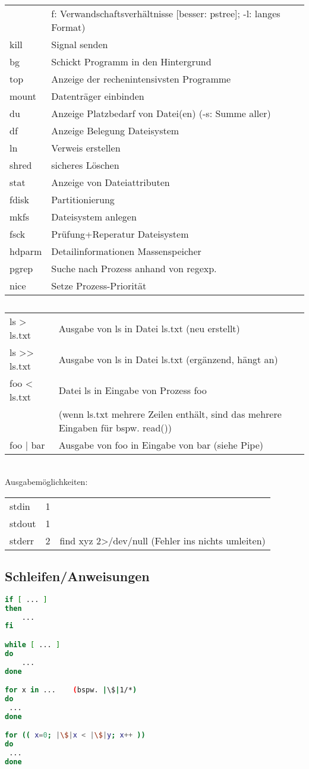 \begin{longtable}[l]{ l | l }
& f: Verwandschaftsverhältnisse [besser: pstree]; -l: langes Format)\\
kill & Signal senden\\
bg & Schickt Programm in den Hintergrund\\
top & Anzeige der rechenintensivsten Programme\\
mount & Datenträger einbinden\\
du & Anzeige Platzbedarf von Datei(en) (-s: Summe aller)\\
df & Anzeige Belegung Dateisystem\\
ln & Verweis erstellen\\
shred & sicheres Löschen\\
stat & Anzeige von Dateiattributen\\
fdisk & Partitionierung\\
mkfs & Dateisystem anlegen\\
fsck & Prüfung+Reperatur Dateisystem\\
hdparm & Detailinformationen Massenspeicher\\
pgrep & Suche nach Prozess anhand von regexp.\\
nice & Setze Prozess-Priorität
\end{longtable}

\subsection[Weiterleitung]{}
\begin{tabular}{l l}
ls > ls.txt & Ausgabe von ls in Datei ls.txt (neu erstellt)\\
ls >> ls.txt & Ausgabe von ls in Datei ls.txt (ergänzend, hängt an)\\
foo < ls.txt & Datei ls in Eingabe von Prozess foo\\
& (wenn ls.txt mehrere Zeilen enthält, sind das mehrere Eingaben für bspw. read())\\
foo | bar & Ausgabe von foo in Eingabe von bar (siehe Pipe)
\end{tabular}\\
Ausgabemöglichkeiten:\\
\begin{tabular}{l l l}
stdin & 1 &\\
stdout & 1 &\\
stderr & 2 & find xyz 2>/dev/null (Fehler ins nichts umleiten) 
\end{tabular}

\subsection{Schleifen/Anweisungen}
\begin{lstlisting}[language=bash]
if [ ... ] 
then 
	... 
fi

while [ ... ] 
do 
	... 
done

for x in ...	(bspw. |\$|1/*)
do 
 ...
done

for (( x=0; |\$|x < |\$|y; x++ ))
do
 ...
done
\end{lstlisting}
